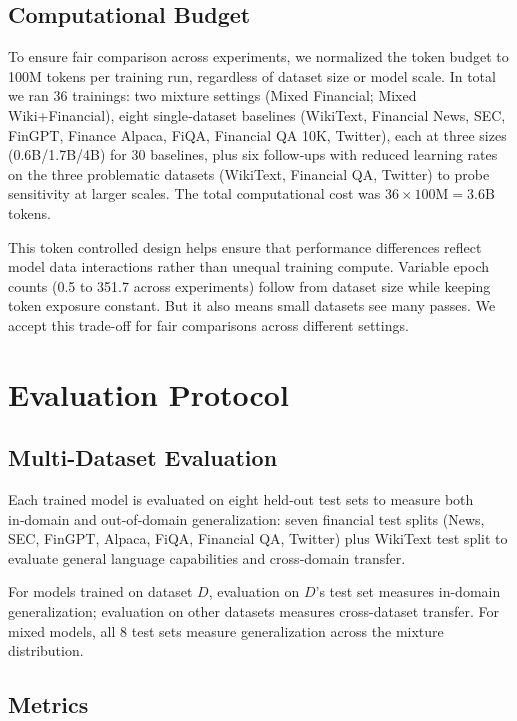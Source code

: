 \subsection{Computational Budget}

To ensure fair comparison across experiments, we normalized the token budget to 100M tokens per training run, regardless of dataset size or model scale. In total we ran 36 trainings: two mixture settings (Mixed Financial; Mixed Wiki+Financial), eight single‑dataset baselines (WikiText, Financial News, SEC, FinGPT, Finance Alpaca, FiQA, Financial QA 10K, Twitter), each at three sizes (0.6B/1.7B/4B) for 30 baselines, plus six follow‑ups with reduced learning rates on the three problematic datasets (WikiText, Financial QA, Twitter) to probe sensitivity at larger scales. The total computational cost was $36\times100\text{M}=3.6\text{B}$ tokens.

This token controlled design helps ensure that performance differences reflect model data interactions rather than unequal training compute. Variable epoch counts (0.5 to 351.7 across experiments) follow from dataset size while keeping token exposure constant. But it also means small datasets see many passes. We accept this trade-off for fair comparisons across different settings.

\section{Evaluation Protocol}

\subsection{Multi-Dataset Evaluation}

Each trained model is evaluated on eight held‑out test sets to measure both in‑domain and out‑of‑domain generalization: seven financial test splits (News, SEC, FinGPT, Alpaca, FiQA, Financial QA, Twitter) plus WikiText test split to evaluate general language capabilities and cross‑domain transfer.

For models trained on dataset $D$, evaluation on $D$'s test set measures in-domain generalization; evaluation on other datasets measures cross-dataset transfer. For mixed models, all 8 test sets measure generalization across the mixture distribution.

\subsection{Metrics}


